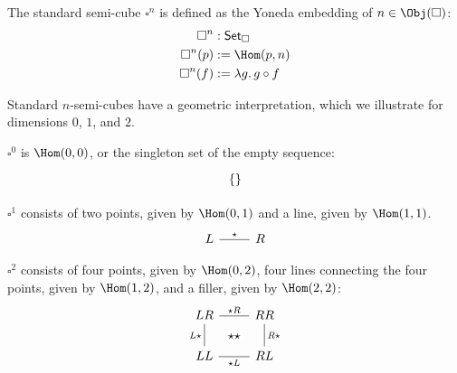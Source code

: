 \documentclass[10pt]{art.cls/art}
\newcommand{\Cube}{\ensuremath{\boldsymbol{\square}}}
\newcommand{\CSet}{\ensuremath{\mathsf{Set}_{\boldsymbol{\square}}}}
\newcommand{\kstar}{{\star}}
\begin{document}
\begin{definition}[$\Cube^n$]
  The standard semi-cube $\Cube^n$ is defined as the Yoneda embedding of $n \in \Obj(\Cube)$:
  \begin{align*}
    \Cube^n    & : \CSet                    \\
    \Cube^n(p) & := \Hom(p, n)              \\
    \Cube^n(f) & := \lambda g .\, g \circ f
  \end{align*}
\end{definition}

Standard $n$-semi-cubes have a geometric interpretation, which we illustrate for dimensions $0$, $1$, and $2$.

\begin{example}[$\Cube^0$]
  $\Cube^0$ is $\Hom(0, 0)$, or the singleton set of the empty sequence:
  \begin{equation*}
    \begin{tikzcd}
      \{\}
    \end{tikzcd}
  \end{equation*}
\end{example}

\begin{example}[$\Cube^1$]
  $\Cube^1$ consists of two points, given by $\Hom(0, 1)$ and a line, given by $\Hom(1, 1)$.
  \begin{equation*}
    \begin{tikzcd}
      L \arrow[r, "\kstar", dash] & R
    \end{tikzcd}
  \end{equation*}
\end{example}

\begin{example}[$\Cube^2$]
  $\Cube^2$ consists of four points, given by $\Hom(0, 2)$, four lines connecting the four points, given by $\Hom(1, 2)$, and a filler, given by $\Hom(2, 2)$:
  \begin{equation*}
    \begin{tikzcd}
      LR \arrow[r, dash, "\kstar R"{name=F}] \arrow[d, dash, "L\kstar" left] & RR \arrow[d, dash, "R\kstar"] \\
      LL \arrow[r, dash, "\kstar L"{name=T, below}] & RL \\
      \arrow[rightarrow, from=F, to=T, phantom, "\kstar\kstar" description]
    \end{tikzcd}
  \end{equation*}
\end{example}
\end{document}
